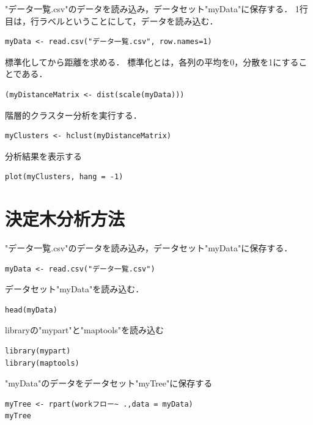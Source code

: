 "データ一覧.csv"のデータを読み込み，データセット"myData"に保存する．
1行目は，行ラベルということにして，データを読み込む．

{
\small
\begin{verbatim}
myData <- read.csv("データ一覧.csv", row.names=1)
\end{verbatim}
}


標準化してから距離を求める．
標準化とは，各列の平均を0，分散を1にすることである．
{
\small
\begin{verbatim}
(myDistanceMatrix <- dist(scale(myData)))
\end{verbatim}
}


階層的クラスター分析を実行する．
{
\small
\begin{verbatim}
myClusters <- hclust(myDistanceMatrix)
\end{verbatim}
}

分析結果を表示する
{
\small
\begin{verbatim}
plot(myClusters, hang = -1)
\end{verbatim}
}





\section{決定木分析方法}

"データ一覧.csv"のデータを読み込み，データセット"myData"に保存する．
{
\small
\begin{verbatim}
myData <- read.csv("データ一覧.csv")
\end{verbatim}
}


データセット"myData"を読み込む．
{
\small
\begin{verbatim}
head(myData)
\end{verbatim}
}

libraryの"mypart"と"maptools"を読み込む
{
\small
\begin{verbatim}
library(mypart)
library(maptools)
\end{verbatim}
}
"myData"のデータをデータセット"myTree"に保存する
{
\small
\begin{verbatim}
myTree <- rpart(workフロー~ .,data = myData)
myTree
\end{verbatim}
}


